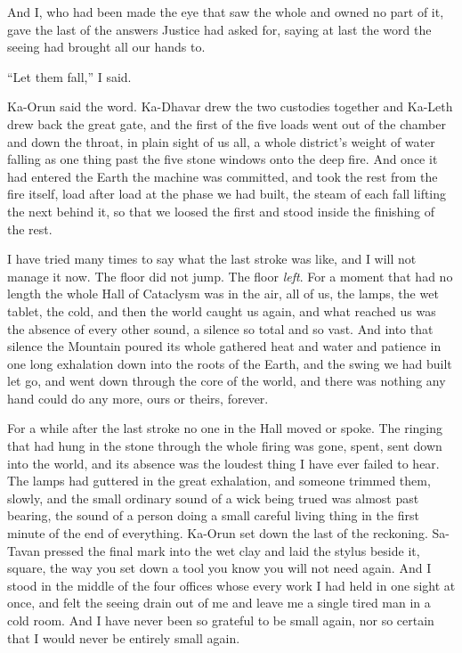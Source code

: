 And I, who had been made the eye that saw the whole and owned no part of it, gave the last of the answers Justice had asked for, saying at last the word the seeing had brought all our hands to.\par

``Let them fall,'' I said.\par

Ka-Orun said the word. Ka-Dhavar drew the two custodies together and Ka-Leth drew back the great gate, and the first of the five loads went out of the chamber and down the throat, in plain sight of us all, a whole district's weight of water falling as one thing past the five stone windows onto the deep fire. And once it had entered the Earth the machine was committed, and took the rest from the fire itself, load after load at the phase we had built, the steam of each fall lifting the next behind it, so that we loosed the first and stood inside the finishing of the rest.\par

\ornament

I have tried many times to say what the last stroke was like, and I will not manage it now. The floor did not jump. The floor \emph{left}. For a moment that had no length the whole Hall of Cataclysm was in the air, all of us, the lamps, the wet tablet, the cold, and then the world caught us again, and what reached us was the absence of every other sound, a silence so total and so vast. And into that silence the Mountain poured its whole gathered heat and water and patience in one long exhalation down into the roots of the Earth, and the swing we had built let go, and went down through the core of the world, and there was nothing any hand could do any more, ours or theirs, forever.\par

For a while after the last stroke no one in the Hall moved or spoke. The ringing that had hung in the stone through the whole firing was gone, spent, sent down into the world, and its absence was the loudest thing I have ever failed to hear. The lamps had guttered in the great exhalation, and someone trimmed them, slowly, and the small ordinary sound of a wick being trued was almost past bearing, the sound of a person doing a small careful living thing in the first minute of the end of everything. Ka-Orun set down the last of the reckoning. Sa-Tavan pressed the final mark into the wet clay and laid the stylus beside it, square, the way you set down a tool you know you will not need again. And I stood in the middle of the four offices whose every work I had held in one sight at once, and felt the seeing drain out of me and leave me a single tired man in a cold room. And I have never been so grateful to be small again, nor so certain that I would never be entirely small again.\par

